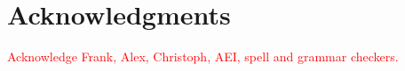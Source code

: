 \section{Acknowledgments}
\textcolor{red}{Acknowledge Frank, Alex, Christoph, AEI, spell and grammar checkers.}\\